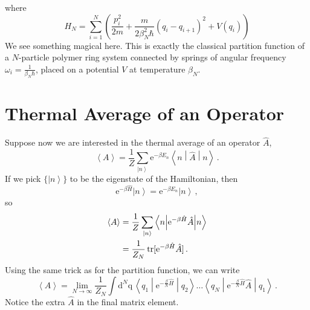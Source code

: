 \documentclass{article}
\theoremstyle{plain}\theoremheaderfont{\normalfont\itshape}\theorembodyfont{\rmfamily}\theoremseparator{.}\newtheorem*{rem}{Remark}\newtheorem*{ex}{Example}\newtheorem*{proof}{Proof}\newtheorem*{altp}{Alternative proof}
\theoremstyle{plain}\theoremheaderfont{\normalfont\bfseries}\theorembodyfont{\rmfamily}\theoremseparator{.}\newtheorem{thm}{Theorem}[section]\newtheorem{lem}[thm]{Lemma}\newtheorem{prop}[thm]{Proposition}\newtheorem*{cor}{Corollary}\newtheorem{defn}[thm]{Definition}\newtheorem{clm}[thm]{Claim}\newtheorem{clminproof}{Claim}
\theoremstyle{break}\theoremheaderfont{\normalfont\itshape}\theorembodyfont{\rmfamily}\theoremseparator{.\medskip}\newtheorem*{proofskip}{Proof}\newtheorem*{exs}{Examples}\newtheorem*{rems}{Remarks}
\theoremstyle{break}\theoremheaderfont{\normalfont\bfseries}\theorembodyfont{\rmfamily}\theoremseparator{.\medskip}\newtheorem{lemskip}[thm]{Lemma}\newtheorem{defnskip}[thm]{Definition}\newtheorem{propskip}[thm]{Proposition}\newtheorem{thmskip}[thm]{Theorem}
\numberwithin{equation}{section}
\newcommand{\ee}{\mathrm{e}}
\newcommand{\dd}[2][]{\mathrm{d}^{#1} #2\,}
\newcommand{\ket}[1]{\left| #1 \right\rangle}
\newcommand{\mel}[3]{\left\langle #1 \middle| #2 \middle| #3 \right\rangle}
\newcommand{\eval}[1]{\left\langle #1 \right\rangle}
\newcommand{\expval}[2]{\left\langle #2 \middle| #1 \middle| #2 \right\rangle}
\newcommand{\vb}[1]{\bm{\mathrm{#1}}}
\DeclareMathOperator{\tr}{tr}
\begin{document}
    where
    \begin{equation}
        H_N=\sum_{i=1}^{N}\left(\frac{p_i^2}{2m}+\frac{m}{2\beta_N^2\hbar}(q_i-q_{i+1})^2+V(q_i)\right)
    \end{equation}
    We see something magical here. This is exactly the classical partition function of a \(N\)-particle polymer ring system connected by springs of angular frequency \(\omega_i=\frac{1}{\beta_N\hbar}\), placed on a potential \(V\) at temperature \(\beta_N\).

    \newpage

    \section{Thermal Average of an Operator}
    Suppose now we are interested in the thermal average of an operator \(\hat{A}\),
    \begin{equation}
        \eval{A}=\frac{1}{Z}\sum_{\ket{n}}\ee^{-\beta E_n}\expval{\hat{A}}{n}\,.
    \end{equation}
    If we pick \(\{\ket{n}\}\) to be the eigenstate of the Hamiltonian, then
    \begin{equation}
        \ee^{-\beta\hat{H}}\ket{n}=\ee^{-\beta E_n}\ket{n}\,,
    \end{equation}
    so
    \begin{align}
        \eval{A}&=\frac{1}{Z}\sum_{\ket{n}}\expval{\ee^{-\beta \hat{H}}\hat{A}}{n}\notag \\
        &=\frac{1}{Z_N}\tr[\ee^{-\beta\hat{H}}\hat{A}]\,.
    \end{align}
    Using the same trick as for the partition function, we can write
    \begin{equation}
        \eval{A}=\lim_{N\to\infty}\frac{1}{Z_N}\int\dd[N]{\vb{q}}\mel{q_1}{\ee^{-\frac{\beta}{N}\hat{H}}}{q_2}\dots\mel{q_N}{\ee^{-\frac{\beta}{N}\hat{H}}\hat{A}}{q_1}\,.
    \end{equation}
    Notice the extra \(\hat{A}\) in the final matrix element.
    
\end{document}

